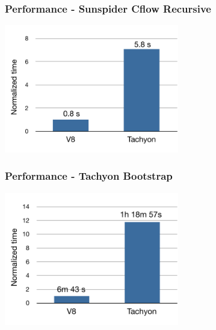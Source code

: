 % 

\begin{frame}
\frametitle{\bf Performance - Sunspider Cflow Recursive}

\begin{center}
\includegraphics[width=3in]{images/perf-sunspider}
\end{center}


\end{frame}

\begin{frame}
\frametitle{\bf Performance - Tachyon Bootstrap}

\begin{center}
\includegraphics[width=3in]{images/perf-bootstrap}
\end{center}
\end{frame}

